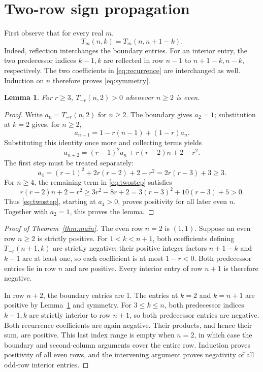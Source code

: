 \documentclass[11pt]{article}
\newtheorem{lemma}[theorem]{Lemma}
\begin{document}
\section{Two-row sign propagation}
First observe that for every real $m$,
\begin{equation}\label{eq:symmetry}
 T_m(n,k)=T_m(n,n+1-k).
\end{equation}
Indeed, reflection interchanges the boundary entries. For an interior
entry, the two predecessor indices $k-1,k$ are reflected in row $n-1$
to $n+1-k,n-k$, respectively. The two coefficients in
\eqref{eq:recurrence} are interchanged as well. Induction on $n$
therefore proves \eqref{eq:symmetry}.

\begin{lemma}\label{lem:second}
For $r\geq3$, $T_{-r}(n,2)>0$ whenever $n\geq2$ is even.
\end{lemma}
\begin{proof}
Write $a_n=T_{-r}(n,2)$ for $n\geq2$. The boundary gives $a_2=1$;
substitution at $k=2$ gives, for $n\geq2$,
\[
 a_{n+1}=1-r(n-1)+(1-r)a_n.
\]
Substituting this identity once more and collecting terms yields
\begin{equation}\label{eq:twostep}
 a_{n+2}=(r-1)^2a_n+r(r-2)n+2-r^2.
\end{equation}
The first step must be treated separately:
\[
 a_4=(r-1)^2+2r(r-2)+2-r^2
     =2r(r-3)+3\geq3.
\]
For $n\geq4$, the remaining term in \eqref{eq:twostep} satisfies
\[
 r(r-2)n+2-r^2
 \geq3r^2-8r+2
 =3(r-3)^2+10(r-3)+5>0.
\]
Thus \eqref{eq:twostep}, starting at $a_4>0$, proves positivity for
all later even $n$. Together with $a_2=1$, this proves the lemma.
\end{proof}

\begin{proof}[Proof of Theorem~\ref{thm:main}]
The even row $n=2$ is $(1,1)$. Suppose an even row $n\geq2$
is strictly positive. For $1<k<n+1$, both coefficients defining
$T_{-r}(n+1,k)$ are strictly negative: their positive integer factors
$n+1-k$ and $k-1$ are at least one, so each coefficient is at most
$1-r<0$. Both predecessor entries lie in row $n$ and are positive.
Every interior entry of row $n+1$ is therefore negative.

In row $n+2$, the boundary entries are 1. The entries at $k=2$
and $k=n+1$ are positive by Lemma~\ref{lem:second} and symmetry.
For $3\leq k\leq n$, both predecessor indices $k-1,k$ are
strictly interior to row $n+1$, so both predecessor entries are
negative. Both recurrence coefficients are again negative. Their
products, and hence their sum, are positive. This last index range
is empty when $n=2$, in which case the boundary and second-column
arguments cover the entire row. Induction proves positivity of
all even rows, and the intervening argument proves negativity of
all odd-row interior entries.
\end{proof}
\end{document}
